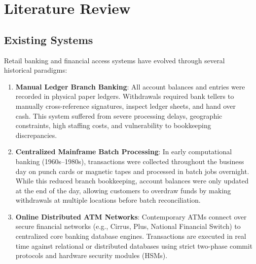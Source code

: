 \documentclass[11pt,a4paper]{report}
\begin{document}
\newpage

\section{Literature Review}

\subsection{Existing Systems}
Retail banking and financial access systems have evolved through several historical paradigms:
\begin{enumerate}
    \item \textbf{Manual Ledger Branch Banking}: All account balances and entries were recorded in physical paper ledgers. Withdrawals required bank tellers to manually cross-reference signatures, inspect ledger sheets, and hand over cash. This system suffered from severe processing delays, geographic constraints, high staffing costs, and vulnerability to bookkeeping discrepancies.
    \item \textbf{Centralized Mainframe Batch Processing}: In early computational banking (1960s--1980s), transactions were collected throughout the business day on punch cards or magnetic tapes and processed in batch jobs overnight. While this reduced branch bookkeeping, account balances were only updated at the end of the day, allowing customers to overdraw funds by making withdrawals at multiple locations before batch reconciliation.
    \item \textbf{Online Distributed ATM Networks}: Contemporary ATMs connect over secure financial networks (e.g., Cirrus, Plus, National Financial Switch) to centralized core banking database engines. Transactions are executed in real time against relational or distributed databases using strict two-phase commit protocols and hardware security modules (HSMs).
\end{enumerate}
\end{document}
